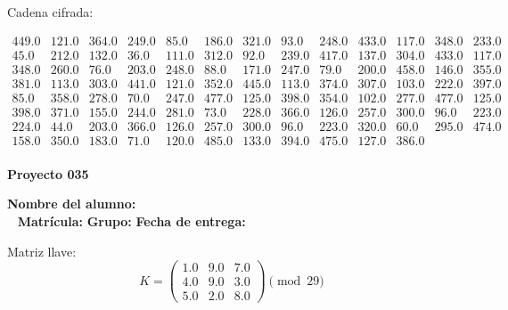 \documentclass[12pt]{article}
\begin{document}
Cadena cifrada:
\begin{center}
$\begin{array}{lllllllllllll}
449.0 & 121.0 & 364.0 & 249.0 & 85.0 & 186.0 & 321.0 & 93.0 & 248.0 & 433.0 & 117.0 & 348.0 & 233.0\\
45.0 & 212.0 & 132.0 & 36.0 & 111.0 & 312.0 & 92.0 & 239.0 & 417.0 & 137.0 & 304.0 & 433.0 & 117.0\\
348.0 & 260.0 & 76.0 & 203.0 & 248.0 & 88.0 & 171.0 & 247.0 & 79.0 & 200.0 & 458.0 & 146.0 & 355.0\\
381.0 & 113.0 & 303.0 & 441.0 & 121.0 & 352.0 & 445.0 & 113.0 & 374.0 & 307.0 & 103.0 & 222.0 & 397.0\\
85.0 & 358.0 & 278.0 & 70.0 & 247.0 & 477.0 & 125.0 & 398.0 & 354.0 & 102.0 & 277.0 & 477.0 & 125.0\\
398.0 & 371.0 & 155.0 & 244.0 & 281.0 & 73.0 & 228.0 & 366.0 & 126.0 & 257.0 & 300.0 & 96.0 & 223.0\\
224.0 & 44.0 & 203.0 & 366.0 & 126.0 & 257.0 & 300.0 & 96.0 & 223.0 & 320.0 & 60.0 & 295.0 & 474.0\\
158.0 & 350.0 & 183.0 & 71.0 & 120.0 & 485.0 & 133.0 & 394.0 & 475.0 & 127.0 & 386.0\\
\end{array}$
\end{center}

\newpage


\textbf{Proyecto 035}

\textbf{Nombre del alumno:} \underline{\hspace{13cm}}\\\
\vspace{1cm}
\textbf{Matrícula:} \underline{\hspace{4cm}} \hspace{1cm}
\textbf{Grupo:} \underline{\hspace{2cm}}
\textbf{Fecha de entrega:} \underline{\hspace{2cm}}

\medskip

Matriz llave:
\[
K = \begin{pmatrix}
1.0 & 9.0 & 7.0\\
4.0 & 9.0 & 3.0\\
5.0 & 2.0 & 8.0
\end{pmatrix} \pmod{29}
\]
\end{document}
